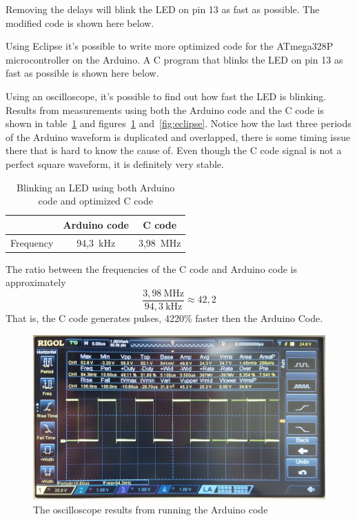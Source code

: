 \documentclass[11pt,a4paper,titlepage]{article}
\begin{document}
\noindent Removing the delays will blink the LED on pin 13 as fast as possible. The modified code is shown here below.


\vspace{2mm}

\noindent Using Eclipse it's possible to write more optimized code for the ATmega328P microcontroller on the Arduino. A C program that blinks the LED on pin 13 as fast as possible is shown here below.

\vspace{2mm}

\vspace{2mm} 

\noindent Using an oscilloscope, it's possible to find out how fast the LED is blinking. Results from measurements using both the Arduino code and the C code is shown in table~\ref{tab:results} and figures~\ref{fig:arduino} and~\ref{fig:eclipse}. Notice how the last three periods of the Arduino waveform is duplicated and overlapped, there is some timing issue there that is hard to know the cause of. Even though the C code signal is not a perfect square  waveform, it is definitely very stable.

\begin{table}[H]
		\centering
		\begin{tabular}{lcc}
			\toprule
			&	Arduino code	& C code\\
			\midrule
			Frequency	&	94,3~kHz	&	3,98~MHz\\
			\bottomrule
		\end{tabular}
		\caption{Blinking an LED using both Arduino code and optimized C code}
		\label{tab:results}
\end{table}

The ratio between the frequencies of the C code and Arduino code is approximately $$\frac{3,98~\text{MHz}}{94,3~\text{kHz}} \approx 42,2 $$
That is, the C code generates pulses, 4220\% faster then the Arduino Code.

\begin{figure}[H]
	\centering
	\includegraphics[width=\textwidth]{graphics/arduino_edit}
	\caption{The oscilloscope results from running the Arduino code}
	\label{fig:arduino}
\end{figure}
\end{document}
